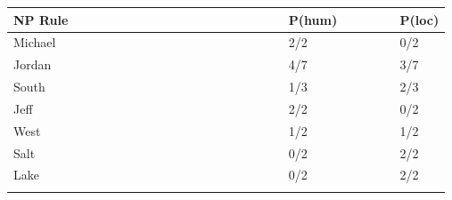 \documentclass[11pt]{article}
\begin{document}
\begin{enumerate}
\begin{enumerate}
   \begin{center} 
    \begin{tabular}{lll} 
   \textbf{NP Rule~~~~~~~~~~~~~~~~~~~~~~~~~~~~~} &
   \textbf{P({\sc hum)~~~~~~~}} & \textbf{P({\sc loc})} \\ \hline
        Michael & 2/2 & 0/2 \\
        Jordan & 4/7 & 3/7 \\
        South & 1/3 & 2/3 \\ 
        Jeff & 2/2 & 0/2 \\ 
        West & 1/2 & 1/2 \\ 
        Salt & 0/2 & 2/2 \\ 
        Lake & 0/2 & 2/2 \\ \hline\\
   \end{tabular}
   \end{center}
 \vspace*{.2in}



\end{enumerate}
\end{enumerate}
\end{document}
